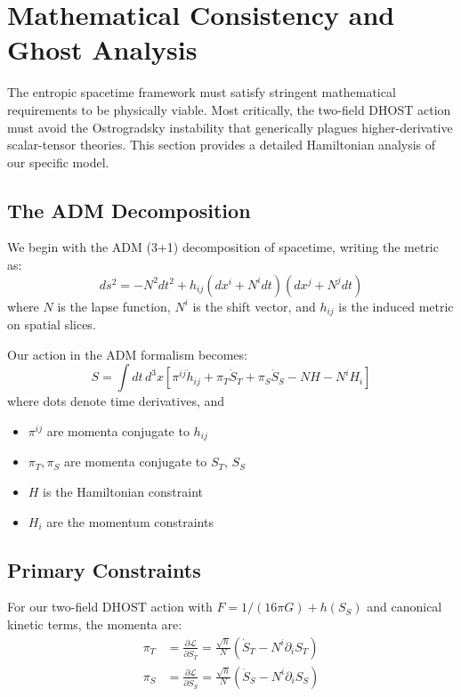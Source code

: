 \documentclass[12pt]{article}
\begin{document}
\section{Mathematical Consistency and Ghost Analysis}

The entropic spacetime framework must satisfy stringent mathematical requirements to be physically viable. Most critically, the two-field DHOST action must avoid the Ostrogradsky instability that generically plagues higher-derivative scalar-tensor theories. This section provides a detailed Hamiltonian analysis of our specific model.

\subsection{The ADM Decomposition}

We begin with the ADM (3+1) decomposition of spacetime, writing the metric as:
\begin{equation}
ds^2 = -N^2 dt^2 + h_{ij}(dx^i + N^i dt)(dx^j + N^j dt)
\end{equation}
where $N$ is the lapse function, $N^i$ is the shift vector, and $h_{ij}$ is the induced metric on spatial slices.

Our action in the ADM formalism becomes:
\begin{equation}
S = \int dt\, d^3x \left[ \pi^{ij} \dot{h}_{ij} + \pi_T \dot{S}_T + \pi_S \dot{S}_S - N H - N^i H_i \right]
\end{equation}
where dots denote time derivatives, and
\begin{itemize}
    \item $\pi^{ij}$ are momenta conjugate to $h_{ij}$
    \item $\pi_T, \pi_S$ are momenta conjugate to $S_T$, $S_S$
    \item $H$ is the Hamiltonian constraint
    \item $H_i$ are the momentum constraints
\end{itemize}

\subsection{Primary Constraints}

For our two-field DHOST action with $F = 1/(16\pi G) + h(S_S)$ and canonical kinetic terms, the momenta are:
\begin{align}
\pi_T &= \frac{\partial \mathcal{L}}{\partial \dot{S}_T} = \frac{\sqrt{h}}{N} \left(\dot{S}_T - N^i \partial_i S_T \right) \\
\pi_S &= \frac{\partial \mathcal{L}}{\partial \dot{S}_S} = \frac{\sqrt{h}}{N} \left(\dot{S}_S - N^i \partial_i S_S \right)
\end{align}
\end{document}
